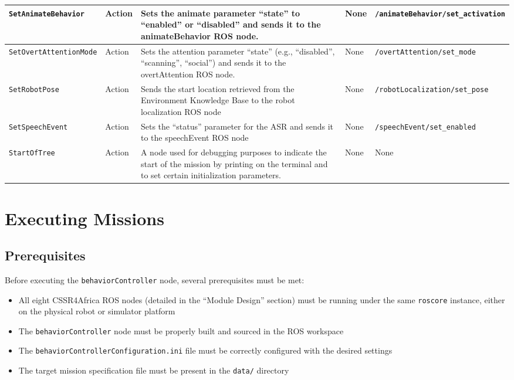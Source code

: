 \documentclass{CSSRforAfrica}
\begin{document}
\begin{landscape}
{\begin{longtable}[c]{|p{4.3cm}|p{1.4cm}|p{4cm}|p{3.8cm}|p{6.6cm}|}
    \texttt{\footnotesize SetAnimateBehavior} & Action & Sets the animate parameter ``state'' to ``enabled'' or ``disabled'' and sends it to the animateBehavior ROS node. & None & \texttt{\footnotesize /animateBehavior/set\_activation} \\ \hline
    \texttt{\footnotesize SetOvertAttentionMode} & Action & Sets the attention parameter ``state'' (e.g., ``disabled'', ``scanning'', ``social'') and sends it to the overtAttention ROS node. & None & \texttt{\footnotesize /overtAttention/set\_mode} \\ \hline
    \texttt{\footnotesize SetRobotPose} & Action & Sends the start location retrieved from the Environment Knowledge Base to the robot localization ROS node & None & \texttt{\footnotesize /robotLocalization/set\_pose} \\ \hline
    \texttt{\footnotesize SetSpeechEvent} & Action & Sets the ``status'' parameter for the ASR and sends it to the speechEvent ROS node & None & \texttt{\footnotesize /speechEvent/set\_enabled} \\ \hline
    \texttt{\footnotesize StartOfTree} & Action & A node used for debugging purposes to indicate the start of the mission by printing on the terminal and to set certain initialization parameters. & None & None \\ \hline
\end{longtable}
}
\end{landscape}


\section{Executing Missions}
\subsection{Prerequisites}
Before executing the \texttt{\small behaviorController} node, several prerequisites must be met:
\begin{itemize}
    \item All eight CSSR4Africa ROS nodes (detailed in the ``Module Design'' section) must be running under the same \texttt{\small roscore} instance, either on the physical robot or simulator platform
    \item The \texttt{\small behaviorController} node must be properly built and sourced in the ROS workspace
    \item The \texttt{\small behaviorControllerConfiguration.ini} file must be correctly configured with the desired settings
    \item The target mission specification file must be present in the \texttt{\small data/} directory
\end{itemize}
\end{document}
